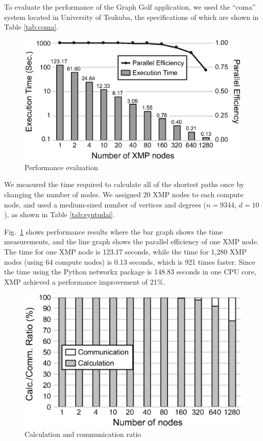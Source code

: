 \documentclass[graybox]{svmult}
\begin{document}
To evaluate the performance of the Graph Golf application, 
we used the ``coma'' system located in University of Tsukuba, the specifications of which are shown in Table \ref{tab:coma}. 

\begin{figure}[t]
\centering
\includegraphics[scale=0.5,clip]{img/result.eps}
\caption{Performance evaluation} \label{fig:result}
\end{figure}

We measured the time required to calculate all of the shortest paths once by changing the number of nodes.
We assigned 20 XMP nodes to each compute node, and used
a medium-sized number of vertices and degrees ($n = 9344$, $d = 10$), as shown in Table \ref{tab:syutudai}.

Fig.~\ref{fig:result} shows performance results where the bar graph shows the time measurements, 
and the line graph shows the parallel efficiency of one XMP node.
The time for one XMP node is 123.17 seconds, 
while the time for 1,280 XMP nodes (using 64 compute nodes) is 0.13 seconds, 
which is 921 times faster. 
Since the time using the Python networkx package is 148.83 seconds in one CPU core, 
XMP achieved a performance improvement of 21\%.

\begin{figure}[t]
\centering
\includegraphics[scale=0.5,clip]{img/comm.eps}
\caption{Calculation and communication ratio}\label{fig:comm}
\end{figure}
\end{document}
